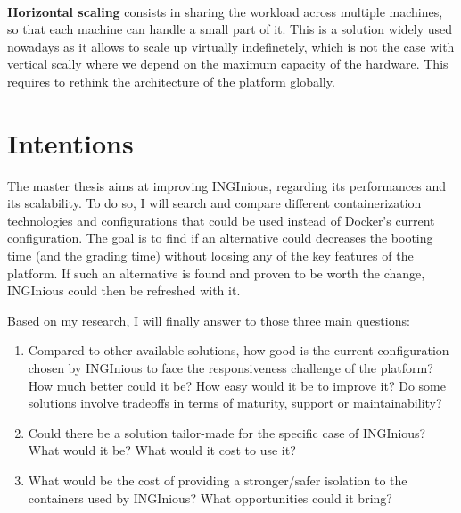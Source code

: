 \paragraph{} \textbf{Horizontal scaling} consists in sharing the workload across multiple machines, so that each machine can handle a small part of it.  This is a solution widely used nowadays as it allows to scale up virtually indefinetely, which is not the case with vertical scally where we depend on the maximum capacity of the hardware.  This requires to rethink the architecture of the platform globally.

\section{Intentions}
The master thesis aims at improving INGInious, regarding its performances and its scalability.  To do so, I will search and compare different containerization technologies and configurations that could be used instead of Docker's current configuration.  The goal is to find if an alternative could decreases the booting time (and the grading time) without loosing any of the key features of the platform.  If such an alternative is found and proven to be worth the change, INGInious could then be refreshed with it.

Based on my research, I will finally answer to those three main questions:
\begin{enumerate}
  \item Compared to other available solutions, how good is the current configuration chosen by INGInious to face the responsiveness challenge of the platform?  How much better could it be?  How easy would it be to improve it?  Do some solutions involve tradeoffs in terms of maturity, support or maintainability?
  \item Could there be a solution tailor-made for the specific case of INGInious?  What would it be?  What would it cost to use it?
  \item What would be the cost of providing a stronger/safer isolation to the containers used by INGInious?  What opportunities could it bring?
\end{enumerate}
